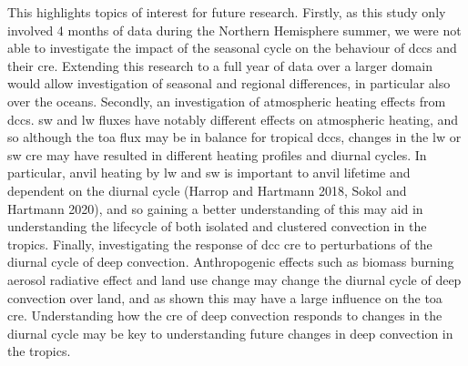 This highlights topics of interest for future research. Firstly, as this
study only involved 4 months of data during the Northern Hemisphere
summer, we were not able to investigate the impact of the seasonal cycle
on the behaviour of \acrshort{dcc}s and their \acrshort{cre}. Extending this research to a
full year of data over a larger domain would allow investigation of
seasonal and regional differences, in particular also over the oceans.
Secondly, an investigation of atmospheric heating effects from \acrshort{dcc}s. \acrshort{sw}
and \acrshort{lw} fluxes have notably different effects on atmospheric heating, and
so although the \acrshort{toa} flux may be in balance for tropical
\acrshort{dcc}s, changes in the \acrshort{lw} or \acrshort{sw} \acrshort{cre} may have resulted in different heating
profiles and diurnal cycles. In particular, anvil heating by \acrshort{lw} and \acrshort{sw}
is important to anvil lifetime and dependent on the diurnal cycle
(Harrop and Hartmann 2018, Sokol and Hartmann 2020), and so gaining a
better understanding of this may aid in understanding the lifecycle of
both isolated and clustered convection in the tropics. Finally,
investigating the response of \acrshort{dcc} \acrshort{cre} to perturbations of the diurnal
cycle of deep convection. Anthropogenic effects such as biomass burning
aerosol radiative effect and land use change may change the diurnal
cycle of deep convection over land, and as shown this may have a large
influence on the \acrshort{toa} \acrshort{cre}. Understanding how the \acrshort{cre} of deep convection
responds to changes in the diurnal cycle may be key to understanding
future changes in deep convection in the tropics.


